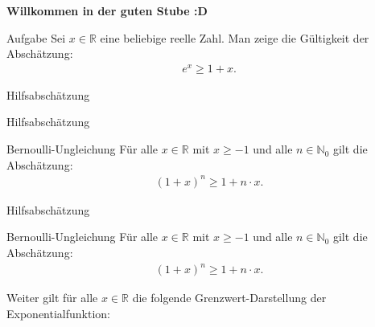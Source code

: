 \documentclass[10pt]{beamer}
\title{}
\author{Artur's \( \oint \) Mathematikstübchen}
\date{}
\def\bN{\mathbb{N}}
\def\bR{\mathbb{R}}
\begin{document}

\begin{frame}
    \begin{center}
        \textbf{\huge Willkommen in der guten Stube \newline \newline :D}
    \end{center}
\end{frame}




\begin{frame}
    \begin{alertblock}{Aufgabe}
        Sei \( x \in \bR \) eine beliebige reelle Zahl. Man zeige die Gültigkeit der Abschätzung:
        \begin{align*}
            e^{x}
            \geq 1 + x.
        \end{align*}
    \end{alertblock}
\end{frame}



\begin{frame}{Hilfsabschätzung}
    
\end{frame}



\begin{frame}{Hilfsabschätzung}
    \begin{block}{Bernoulli-Ungleichung}
        Für alle \( x \in \bR \) mit \( x \geq - 1 \) und alle \( n \in \bN_{0} \) gilt die Abschätzung:
        \begin{align*}
            \left( 1 + x \right)^{n}
            \geq 1 + n \cdot x.
        \end{align*}
    \end{block}
\end{frame}



\begin{frame}{Hilfsabschätzung}
    \begin{block}{Bernoulli-Ungleichung}
        Für alle \( x \in \bR \) mit \( x \geq - 1 \) und alle \( n \in \bN_{0} \) gilt die Abschätzung:
        \begin{align*}
            \left( 1 + x \right)^{n}
            \geq 1 + n \cdot x.
        \end{align*}
    \end{block}
    Weiter gilt für alle \( x \in \bR \) die folgende Grenzwert-Darstellung der Exponentialfunktion:
\end{frame}
\end{document}
